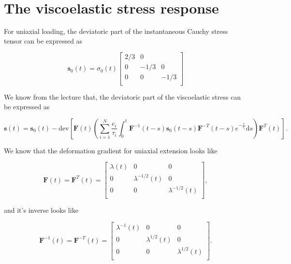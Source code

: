 \documentclass[12pt,a4paper]{article}
\begin{document}
\newpage

\section{The viscoelastic stress response}

For uniaxial loading, the deviatoric part of the instantaneous Cauchy stress tensor can be expressed as

\begin{equation}
    \boldsymbol{s}_0(t) = 
    \sigma_0(t)
    \begin{bmatrix}
        2/3 & 0 & \\
        0 & -1/3 & 0\\
        0 & 0 & -1/3\\
    \end{bmatrix}
\end{equation}


We know from the lecture that, the deviatoric part of the viscoelastic stress can be expressed as

\begin{equation}
\boldsymbol{s}(t) = \boldsymbol{s}_0(t) - 
\text{dev}\left[
    \boldsymbol{F}(t)
        \left(
            \sum_{i=1}^N \frac{e_i}{\tau_i} \int_0^t \boldsymbol{F}^{-1}(t-s) \boldsymbol{s}_0(t-s) \boldsymbol{F}^{-T}(t-s)e^{-\frac{s}{\tau_i}}\text{d}s
        \right)
    \boldsymbol{F}^T(t)
\right].
\end{equation}

We know that the deformation gradient for uniaxial extension looks like

\begin{equation}
\boldsymbol{F}(t) = \boldsymbol{F}^T(t) = 
\begin{bmatrix}
    \lambda(t) & 0 & 0\\
    0&\lambda^{-1/2}(t)&0\\
    0&0&\lambda^{-1/2}(t)\\
\end{bmatrix},
\end{equation}

and it's inverse looks like

\begin{equation}
\boldsymbol{F}^{-1}(t) =  \boldsymbol{F}^{-T}(t)=
\begin{bmatrix}
    \lambda^{-1}(t) & 0 & 0\\
    0&\lambda^{1/2}(t)&0\\
    0&0&\lambda^{1/2}(t)\\
\end{bmatrix}.
\end{equation}
\end{document}
